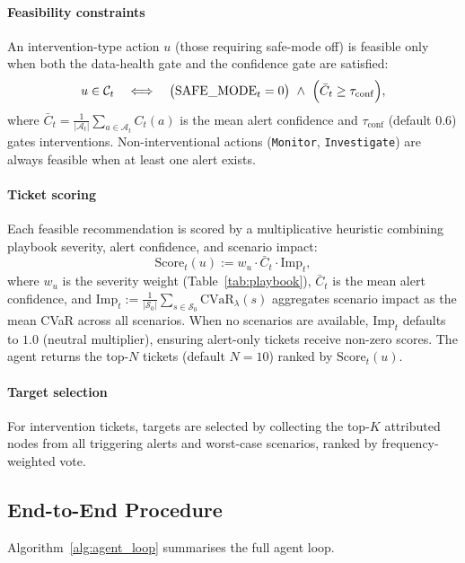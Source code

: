 \paragraph{Feasibility constraints}
An intervention-type action $u$ (those requiring safe-mode off) is feasible only when both the data-health gate and the confidence gate are satisfied:
\begin{equation}
\label{eq:decision_constraints}
u \in \mathcal{C}_t
\quad \Longleftrightarrow \quad
\bigl(\mathrm{SAFE\_MODE}_t=0\bigr)\ \wedge\
\Bigl(\bar{C}_t \ge \tau_{\mathrm{conf}}\Bigr),
\end{equation}
where $\bar{C}_t = \frac{1}{|\mathcal{A}_t|}\sum_{a\in\mathcal{A}_t} C_t(a)$ is the mean alert confidence and $\tau_{\mathrm{conf}}$ (default $0.6$) gates interventions. Non-interventional actions (\texttt{Monitor}, \texttt{Investigate}) are always feasible when at least one alert exists.

\paragraph{Ticket scoring}
Each feasible recommendation is scored by a multiplicative heuristic combining playbook severity, alert confidence, and scenario impact:
\begin{equation}
\label{eq:ticket_score}
\mathrm{Score}_t(u) :=
w_u \cdot \bar{C}_t \cdot \mathrm{Imp}_t,
\end{equation}
where $w_u$ is the severity weight (Table~\ref{tab:playbook}), $\bar{C}_t$ is the mean alert confidence, and $\mathrm{Imp}_t := \frac{1}{|\mathcal{S}_0|}\sum_{s\in\mathcal{S}_0} \mathrm{CVaR}_\lambda(s)$ aggregates scenario impact as the mean CVaR across all scenarios. When no scenarios are available, $\mathrm{Imp}_t$ defaults to $1.0$ (neutral multiplier), ensuring alert-only tickets receive non-zero scores. The agent returns the top-$N$ tickets (default $N=10$) ranked by $\mathrm{Score}_t(u)$.

\paragraph{Target selection}
For intervention tickets, targets are selected by collecting the top-$K$ attributed nodes from all triggering alerts and worst-case scenarios, ranked by frequency-weighted vote.

\subsection{End-to-End Procedure}
Algorithm~\ref{alg:agent_loop} summarises the full agent loop.

